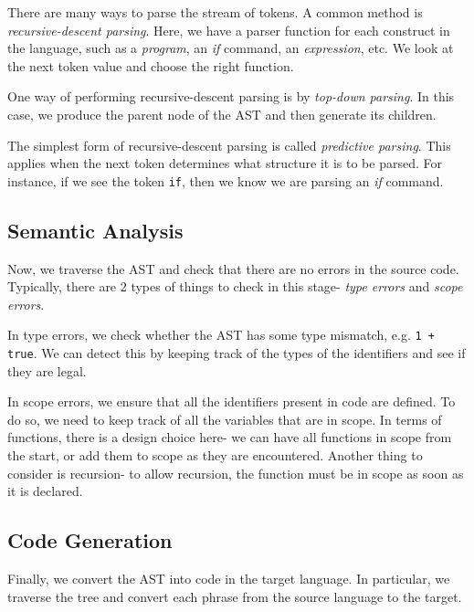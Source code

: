 There are many ways to parse the stream of tokens. A common method is \emph{recursive-descent parsing}. Here, we have a parser function for each construct in the language, such as a \textit{program}, an \textit{if} command, an \textit{expression}, etc. We look at the next token value and choose the right function.

One way of performing recursive-descent parsing is by \emph{top-down parsing}. In this case, we produce the parent node of the AST and then generate its children. 

The simplest form of recursive-descent parsing is called \emph{predictive parsing}. This applies when the next token determines what structure it is to be parsed. For instance, if we see the token \texttt{if}, then we know we are parsing an \textit{if} command.

\subsection{Semantic Analysis}
Now, we traverse the AST and check that there are no errors in the source code. Typically, there are 2 types of things to check in this stage- \emph{type errors} and \emph{scope errors}. 

In type errors, we check whether the AST has some type mismatch, e.g. \texttt{1 + true}. We can detect this by keeping track of the types of the identifiers and see if they are legal.

In scope errors, we ensure that all the identifiers present in code are defined. To do so, we need to keep track of all the variables that are in scope. In terms of functions, there is a design choice here- we can have all functions in scope from the start, or add them to scope as they are encountered. Another thing to consider is recursion- to allow recursion, the function must be in scope as soon as it is declared.

\subsection{Code Generation}
Finally, we convert the AST into code in the target language. In particular, we traverse the tree and convert each phrase from the source language to the target.
